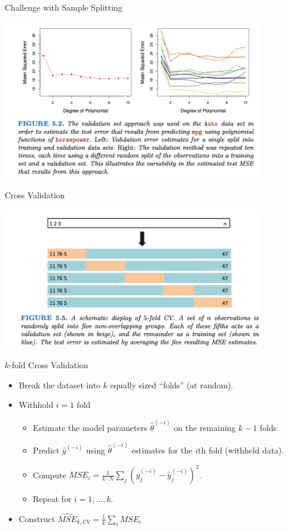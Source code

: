 \documentclass[aspectratio=169]{beamer}
\begin{document}
\begin{frame}{Challenge with Sample Splitting}
\begin{center}
\includegraphics[width=4.5in]{./resources/validation-10fold}
\end{center}
\end{frame}


\begin{frame}{Cross Validation}
\begin{center}
\includegraphics[width=4.5in]{./resources/split-cv5}
\end{center}
\end{frame}

\begin{frame}{$k$-fold Cross Validation}
\begin{itemize}
\item Break the dataset into $k$ equally sized ``folds'' (at random).
\item Withhold $i=1$ fold
\begin{itemize}
\item Estimate the model parameters $\hat{\theta}^{(-i)}$ on the remaining $k-1$ folds
\item Predict $\hat{y}^{(-i)}$ using $\hat{\theta}^{(-i)}$ estimates for the $i$th fold (withheld data).
\item Compute $MSE_i =\frac{1}{k \cdot N} \sum_j (y^{(-i)}_j -\hat{y}^{(-i)}_j)^2$.
\item Repeat for $i=1,\ldots,k$.
\end{itemize}
\item Construct $\widehat{MSE}_{k,CV} = \frac{1}{k} \sum_i MSE_{i}$
\end{itemize}
\end{frame}
\end{document}
